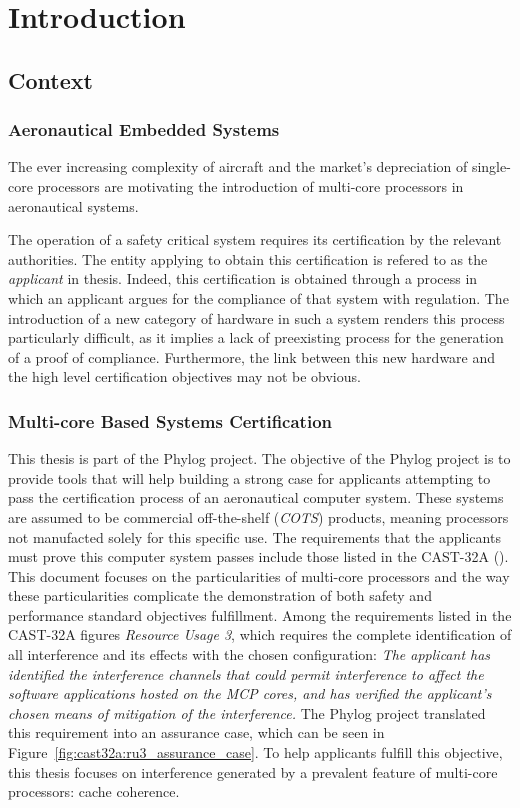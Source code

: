 \chapter{Introduction}

\section{Context}
\subsection{Aeronautical Embedded Systems}
The ever increasing complexity of aircraft and the market's depreciation of
single-core processors are motivating the introduction of multi-core processors
in aeronautical systems.

The operation of a safety critical system requires its certification by the
relevant authorities. The entity applying to obtain this certification is refered
to as the \textit{applicant} in thesis. Indeed, this certification is obtained
through a process in which an applicant argues for the compliance of that
system with regulation. The introduction of a new category of hardware in such
a system renders this process particularly difficult, as it implies a lack of
preexisting process for the generation of a proof of compliance. Furthermore,
the link between this new hardware and the high level certification objectives
may not be obvious.

\subsection{Multi-core Based Systems Certification}
This thesis is part of the Phylog project. The objective of the Phylog project
is to provide tools that will help building a strong case for applicants
attempting to pass the certification process of an aeronautical computer
system.  These systems are assumed to be commercial off-the-shelf
(\textit{COTS}) products, meaning processors not manufacted solely for this
specific use.  The requirements that the applicants must prove this computer
system passes include those listed in the CAST-32A (\cite{cast32}). This
document focuses on the particularities of multi-core processors and the way
these particularities complicate the demonstration of both safety and
performance standard objectives fulfillment. Among the requirements listed in
the CAST-32A figures \textit{Resource Usage 3}, which requires the complete
identification of all interference and its effects with the chosen
configuration: \textit{The applicant has identified the interference channels
that could permit interference to affect the software applications hosted on
the MCP cores, and has verified the applicant's chosen means of mitigation of
the interference.} The Phylog project translated this requirement into an
assurance case, which can be seen in
Figure~\ref{fig:cast32a:ru3_assurance_case}.  To help applicants fulfill this
objective, this thesis focuses on interference generated by a prevalent feature
of multi-core
processors: cache coherence.

